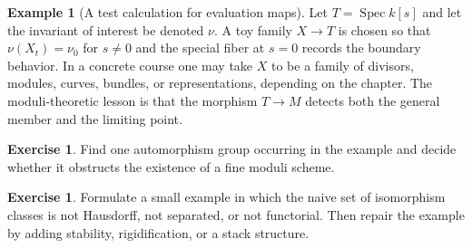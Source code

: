 \documentclass[11pt]{amsart}
\theoremstyle{definition}
\newtheorem{example}[theorem]{Example}
\newtheorem{exercise}[theorem]{Exercise}
\newcommand{\Spec}{\operatorname{Spec}}
\begin{document}
\begin{example}[A test calculation for evaluation maps]
Let $T=\Spec k[s]$ and let the invariant of interest be denoted $\nu$.  A toy family $X\to T$ is chosen so that $\nu(X_t)=\nu_0$ for $s\ne0$ and the special fiber at $s=0$ records the boundary behavior.  In a concrete course one may take $X$ to be a family of divisors, modules, curves, bundles, or representations, depending on the chapter.  The moduli-theoretic lesson is that the morphism $T\to M$ detects both the general member and the limiting point.
\end{example}
\begin{exercise}
Find one automorphism group occurring in the example and decide whether it obstructs the existence of a fine moduli scheme.
\end{exercise}
\begin{exercise}
Formulate a small example in which the naive set of isomorphism classes is not Hausdorff, not separated, or not functorial.  Then repair the example by adding stability, rigidification, or a stack structure.
\end{exercise}
\clearpage
\end{document}
